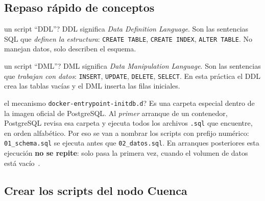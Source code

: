 \documentclass[11pt,a4paper]{article}
\begin{document}
\subsection{Repaso r\'apido de conceptos}

\begin{conceptobox}{un script ``DDL''?}
DDL significa \emph{Data Definition Language}. Son las sentencias SQL que \emph{definen la estructura}: \texttt{CREATE TABLE}, \texttt{CREATE INDEX}, \texttt{ALTER TABLE}. No manejan datos, solo describen el esquema.
\end{conceptobox}

\begin{conceptobox}{un script ``DML''?}
DML significa \emph{Data Manipulation Language}. Son las sentencias que \emph{trabajan con datos}: \texttt{INSERT}, \texttt{UPDATE}, \texttt{DELETE}, \texttt{SELECT}. En esta pr\'actica el DDL crea las tablas vac\'ias y el DML inserta las filas iniciales.
\end{conceptobox}

\begin{conceptobox}{el mecanismo \texttt{docker-entry\-point-initdb.d}?}
Es una carpeta especial dentro de la imagen oficial de PostgreSQL. Al \emph{primer} arranque de un contenedor, PostgreSQL revisa esa carpeta y ejecuta todos los archivos \texttt{.sql} que encuentre, en orden alfab\'etico. Por eso se van a nombrar los scripts con prefijo num\'erico: \texttt{01\_schema.sql} se ejecuta antes que \texttt{02\_datos.sql}. En arranques posteriores esta ejecuci\'on \textbf{no se repite}: solo pasa la primera vez, cuando el volumen de datos est\'a vac\'io~\cite{PostgreSQL16Docs}.
\end{conceptobox}

\subsection{Crear los scripts del nodo Cuenca}
\end{document}
